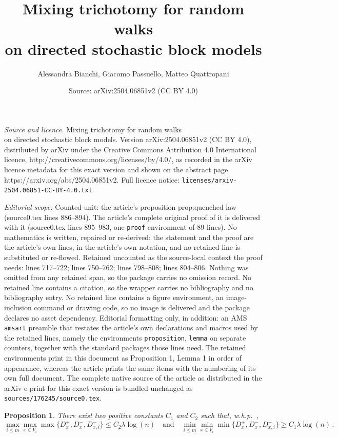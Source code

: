 \documentclass[10pt,a4paper]{amsart}
\title{Mixing trichotomy for random walks\\on directed stochastic block models}
\author{Alessandra Bianchi, Giacomo Passuello, Matteo Quattropani}
\date{Source: arXiv:2504.06851v2 (CC BY 4.0)}
\newtheorem{proposition}{Proposition}
\newcommand{\whp}{{w.h.p.~}}
\begin{document}
\maketitle

\noindent\emph{Source and licence.} Mixing trichotomy for random walks\\on directed stochastic block models. Version arXiv:2504.06851v2 (CC BY 4.0), distributed by arXiv under the Creative Commons Attribution 4.0 International licence, http://creativecommons.org/licenses/by/4.0/, as recorded in the arXiv licence metadata for this exact version and shown on the abstract page https://arxiv.org/abs/2504.06851v2. Full licence notice: \texttt{licenses/arxiv-2504.06851-CC-BY-4.0.txt}.\par\smallskip

\noindent\textit{Editorial scope.} Counted unit: the article's proposition prop:quenched-law (source0.tex lines 886--894). The article's complete original proof of it is delivered with it (source0.tex lines 895--983, one \texttt{proof} environment of 89 lines). No mathematics is written, repaired or re-derived: the statement and the proof are the article's own lines, in the article's own notation, and no retained line is substituted or re-flowed.  Retained uncounted as the source-local context the proof needs: lines 717--722; lines 750--762; lines 798--808; lines 804--806.  Nothing was omitted from any retained span, so the package carries no omission record.  No retained line contains a citation, so the wrapper carries no bibliography and no bibliography entry.  No retained line contains a figure environment, an image-inclusion command or drawing code, so no image is delivered and the package declares no asset dependency.  Editorial formatting only, in addition: an AMS \texttt{amsart} preamble that restates the article's own declarations and macros used by the retained lines, namely the environments \texttt{proposition}, \texttt{lemma} on separate counters, together with the standard packages those lines need.  The retained environments print in this document as Proposition 1, Lemma 1 in order of appearance, whereas the article prints the same items with the numbering of its own full document.  The complete native source of the article as distributed in the arXiv e-print for this exact version is bundled unchanged as \texttt{sources/176245/source0.tex}.
\begin{proposition}\label{prop:concentration-degrees}
	There exist two positive constants $C_1$ and $C_2$ such that, \whp,
	\begin{equation}\nonumber
		\max_{i \le m}\max_{x\in V_i}\max\{D_x^+,D_x^-,D_{x,i}^-\} \le C_2\lambda\log(n)\quad\text{and}\quad \min_{i \le m}\min_{x\in V_i}\min\{D_x^+,D_x^-,D_{x,i}^-\} \ge C_1\lambda\log(n)\,.
	\end{equation}
\end{proposition}
\end{document}
